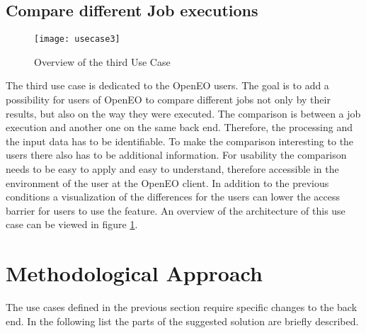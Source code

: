 \documentclass[draft,final]{vutinfth} %
\begin{document}
\subsection{Compare different Job executions}\label{UseCase3}
\begin{figure}[h]
	\centering
	\texttt{[image: usecase3]}
	\caption{Overview of the third Use Case}
	\label{fig:usecase3} %
\end{figure}
The third use case is dedicated to the OpenEO users. The goal is to add a possibility for users of OpenEO to compare different jobs not only by their results, but also on the way they were executed. The comparison is between a job execution and another one on the same back end. Therefore, the processing and the input data has to be identifiable. To make the comparison interesting to the users there also has to be additional information. For usability the comparison needs to be easy to apply and easy to understand, therefore accessible in the environment of the user at the OpenEO client. In addition to the previous conditions a visualization of the differences for the users can lower the access barrier for users to use the feature. An overview of the architecture of this use case can be viewed in figure \ref{fig:usecase3}.

\section{Methodological Approach}\label{Method}
The use cases defined in the previous section require specific changes to the back end. In the following list the parts of the suggested solution are briefly described. 
\end{document}
